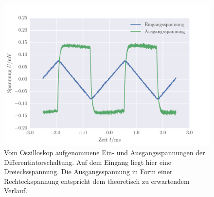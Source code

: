 \FloatBarrier
\begin{figure}[!h]
\centering
\includegraphics[scale=0.75]{../Grafiken/Differentiator_Oszilloskop_Dreieck.pdf}
\caption{Vom Oszilloskop aufgenommene Ein- und Ausgangsspannungen der Differentiatorschaltung. Auf dem Eingang
	liegt hier eine Dreiecksspannung.  Die Ausgangsspannung in Form einer Rechteckspannung entspricht dem theoretisch
	zu erwartendem Verlauf.\label{fig:differentiator_oszilloskop_dreieck}}
\end{figure}
\FloatBarrier